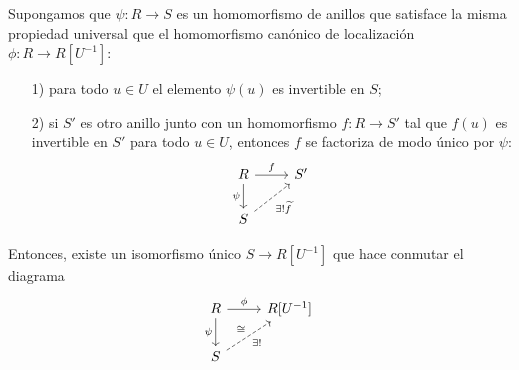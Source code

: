 \begin{proposicion}
  Supongamos que $\psi\colon R\to S$ es un homomorfismo de anillos que satisface
  la misma propiedad universal que el homomorfismo canónico de localización
  $\phi\colon R \to R [U^{-1}]$:

  \begin{enumerate}
  \item[1)] para todo $u \in U$ el elemento $\psi (u)$ es invertible en $S$;

  \item[2)] si $S'$ es otro anillo junto con un homomorfismo $f\colon R \to S'$
    tal que $f (u)$ es invertible en $S'$ para todo $u\in U$, entonces $f$ se
    factoriza de modo único por $\psi$:
    \[ \begin{tikzcd}
        R\ar{r}{f}\ar{d}[swap]{\psi} & S' \\
        S\ar[dashed]{ur}[swap]{\exists ! \widetilde{f}}
      \end{tikzcd} \]
  \end{enumerate}

  Entonces, existe un isomorfismo único $S \to R [U^{-1}]$ que hace conmutar el
  diagrama
  \[ \begin{tikzcd}
      R\ar{r}{\phi}\ar{d}[swap]{\psi} & R [U^{-1}] \\
      S\ar[dashed]{ur}{\isom}[swap]{\exists !}
    \end{tikzcd} \]


\end{proposicion}
